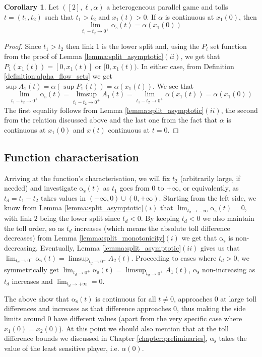 \documentclass[10pt,a4paper]{book}
\newcommand{\as}{\mathrm{\alpha_s}}
\theoremstyle{definition}
\newtheorem{corollary}[definition]{Corollary}
\theoremstyle{comment}
\begin{document}
\begin{corollary}
	\label{corollary:split_asymptotic_continuous}
	Let $([2], \ell, \alpha)$ a heterogeneous parallel game and tolls $t = (t_1, t_2)$ such that $t_1 > t_2$ and $x_1(t) > 0$.
	If $\alpha$ is continuous at $x_1(0)$, then
	\[
		\lim_{t_1 - t_2 \rightarrow 0^+} \as(t) = \alpha(x_1(0))
	\]
\end{corollary}

\begin{proof}
	Since $t_1 > t_2$ then link $1$ is the lower split and, using the $P_i$ set function from the proof of Lemma \ref{lemma:split_asymptotic}$(ii)$, we get that $P_1(x_1(t)) = [0, x_1(t)]$ or $[0, x_1(t))$.
	In either case, from Definition \ref{definition:alpha_flow_sets} we get $\sup A_1(t) = \alpha(\sup P_1(t)) =  \alpha(x_1(t))$.
	We see that
	\[
		\lim_{t_1 - t_2 \rightarrow 0^+} \as(t) = \limsup_{t_1 - t_2 \rightarrow 0^+} A_1(t) = \lim_{t_1 - t_2 \rightarrow 0^+} \alpha(x_1(t)) = \alpha(x_1(0))
	\]
	The first equality follows from Lemma \ref{lemma:split_asymptotic}$(ii)$, the second from the relation discussed above and the last one from the fact that $\alpha$ is continuous at $x_1(0)$ and $x(t)$ continuous at $t = 0$.
\end{proof}

\subsection{Function characterisation}

Arriving at the function's characterisation, we will fix $t_2$ (arbitrarily large, if needed) and investigate $\as(t)$ as $t_1$ goes from $0$ to $+\infty$, or equivalently, as $t_d = t_1 - t_2$ takes values in $(-\infty, 0) \cup (0, +\infty)$.
Starting from the left side, we know from Lemma \ref{lemma:split_asymptotic}$(i)$ that $\lim_{t_d \rightarrow -\infty} \as(t) = 0$, with link $2$ being the lower split since $t_d < 0$.
By keeping $t_d < 0$ we also maintain the toll order, so as $t_d$ increases (which means the absolute toll difference decreases) from Lemma \ref{lemma:split_monotonicity}$(i)$ we get that $\as$ is non-decreasing.
Eventually, Lemma \ref{lemma:split_asymptotic}$(ii)$ gives us that $\lim_{t_d \rightarrow 0^-} \as(t) = \limsup_{t_d \rightarrow 0^-} A_2(t)$.
Proceeding to cases where $t_d > 0$, we symmetrically get $\lim_{t_d \rightarrow 0^+} \as(t) = \limsup_{t_d \rightarrow 0^+} A_1(t)$, $\as$ non-increasing as $t_d$ increases and $\lim_{t_d \rightarrow +\infty} = 0$.

The above show that $\as(t)$ is continuous for all $t \ne 0$, approaches $0$ at large toll differences and increases as that difference approaches $0$, thus making the side limits around $0$ have different values (apart from the very specific case where $x_1(0) = x_2(0)$).
At this point we should also mention that at the toll difference bounds we discussed in Chapter \ref{chapter:preliminaries}, $\as$ takes the value of the least sensitive player, i.e. $\alpha(0)$.
\end{document}

